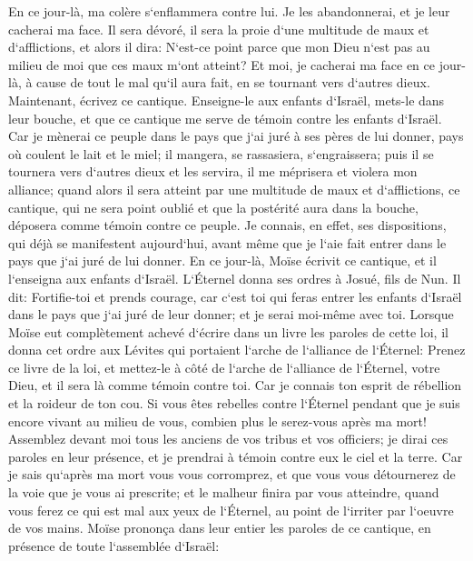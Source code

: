 \verse En ce jour-là, ma colère s`enflammera contre lui. Je les abandonnerai, et je leur cacherai ma face. Il sera dévoré, il sera la proie d`une multitude de maux et d`afflictions, et alors il dira: N`est-ce point parce que mon Dieu n`est pas au milieu de moi que ces maux m`ont atteint? 
\verse Et moi, je cacherai ma face en ce jour-là, à cause de tout le mal qu`il aura fait, en se tournant vers d`autres dieux. 
\verse Maintenant, écrivez ce cantique. Enseigne-le aux enfants d`Israël, mets-le dans leur bouche, et que ce cantique me serve de témoin contre les enfants d`Israël. 
\verse Car je mènerai ce peuple dans le pays que j`ai juré à ses pères de lui donner, pays où coulent le lait et le miel; il mangera, se rassasiera, s`engraissera; puis il se tournera vers d`autres dieux et les servira, il me méprisera et violera mon alliance; 
\verse quand alors il sera atteint par une multitude de maux et d`afflictions, ce cantique, qui ne sera point oublié et que la postérité aura dans la bouche, déposera comme témoin contre ce peuple. Je connais, en effet, ses dispositions, qui déjà se manifestent aujourd`hui, avant même que je l`aie fait entrer dans le pays que j`ai juré de lui donner. 
\verse En ce jour-là, Moïse écrivit ce cantique, et il l`enseigna aux enfants d`Israël. 
\verse L`Éternel donna ses ordres à Josué, fils de Nun. Il dit: Fortifie-toi et prends courage, car c`est toi qui feras entrer les enfants d`Israël dans le pays que j`ai juré de leur donner; et je serai moi-même avec toi. 
\verse Lorsque Moïse eut complètement achevé d`écrire dans un livre les paroles de cette loi, 
\verse il donna cet ordre aux Lévites qui portaient l`arche de l`alliance de l`Éternel: 
\verse Prenez ce livre de la loi, et mettez-le à côté de l`arche de l`alliance de l`Éternel, votre Dieu, et il sera là comme témoin contre toi. 
\verse Car je connais ton esprit de rébellion et la roideur de ton cou. Si vous êtes rebelles contre l`Éternel pendant que je suis encore vivant au milieu de vous, combien plus le serez-vous après ma mort! 
\verse Assemblez devant moi tous les anciens de vos tribus et vos officiers; je dirai ces paroles en leur présence, et je prendrai à témoin contre eux le ciel et la terre. 
\verse Car je sais qu`après ma mort vous vous corromprez, et que vous vous détournerez de la voie que je vous ai prescrite; et le malheur finira par vous atteindre, quand vous ferez ce qui est mal aux yeux de l`Éternel, au point de l`irriter par l`oeuvre de vos mains. 
\verse Moïse prononça dans leur entier les paroles de ce cantique, en présence de toute l`assemblée d`Israël: 

